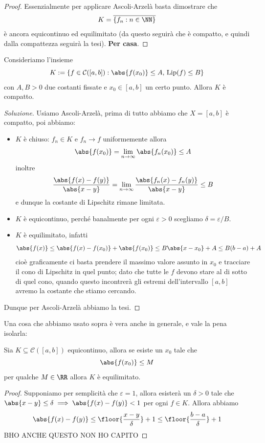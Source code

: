 \documentclass[11pt]{scrartcl}
\begin{document}
	\begin{proof}
		Essenzialmente per applicare Ascoli-Arzelà basta dimostrare che 
		$$K=\overline{\left\{f_n:n\in\NN\right\}}$$
		è ancora equicontinuo ed equilimitato (da questo seguirà che è compatto, e quindi dalla compattezza seguirà la tesi). \textbf{Per casa}.
	\end{proof}
	\begin{exercise}
		Consideriamo l'insieme
		$$K:=\left\{f\in \mathcal{C}([a,b]):\abs{f(x_0)}\le A,\,\text{Lip}(f)\le B\right\}$$
		con $A,B>0$ due costanti fissate e $x_0\in [a,b]$ un certo punto. Allora $K$ è compatto.
	\end{exercise}
	\begin{proof}[Soluzione]
		Usiamo Ascoli-Arzelà, prima di tutto abbiamo che $X=[a,b]$ è compatto, poi abbiamo:
		\begin{itemize}
			\item $K$ è chiuso: $f_n\in K$ e $f_n\to f$ uniformemente allora 
			$$\abs{f(x_0)}=\lim_{n\to\infty}\abs{f_n(x_0)}\le A$$
			inoltre
			$$\frac{\abs{f(x)-f(y)}}{\abs{x-y}}=\lim_{n\to\infty}\frac{\abs{f_n(x)-f_n(y)}}{\abs{x-y}}\le B$$
			e dunque la costante di Lipschitz rimane limitata.
			\item $K$ è equicontinuo, perché banalmente per ogni $\varepsilon>0$ scegliamo $\delta=\varepsilon/B$.
			\item $K$ è equilimitato, infatti 
			$$\abs{f(x)}\le \abs{f(x)-f(x_0)}+\abs{f(x_0)}\le B\abs{x-x_0}+A\le B(b-a)+A$$
			cioè graficamente ci basta prendere il massimo valore assunto in $x_0$ e tracciare il cono di Lipschitz in quel punto; dato che tutte le $f$ devono stare al di sotto di quel cono, quando questo incontrerà gli estremi dell'intervallo $[a,b]$ avremo la costante che stiamo cercando.
		\end{itemize}
		Dunque per Ascoli-Arzelà abbiamo la tesi.
	\end{proof}
	Una cosa che abbiamo usato sopra è vera anche in generale, e vale la pena isolarla:
	\begin{proposition}
		Sia $K\subseteq \mathcal{C}([a,b])$ equicontinuo, allora se esiste un $x_0$ tale che
		$$\abs{f(x_0)}\le M$$
		per qualche $M\in\RR$ allora $K$ è equilimitato.
	\end{proposition}
	\begin{proof}
		Supponiamo per semplicità che $\varepsilon=1$, allora esisterà un $\delta>0$ tale che $\abs{x-y}\le \delta \implies \abs{f(x)-f(y)}<1$ per ogni $f\in K$. Allora abbiamo 
		$$\abs{f(x)-f(y)}\le \floor{\frac{x-y}{\delta}}+1\le \floor{\frac{b-a}{\delta}}+1$$
		BHO ANCHE QUESTO NON HO CAPITO
	\end{proof}
\end{document}
